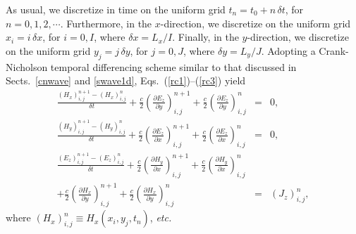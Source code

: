 As usual, we discretize in time on the uniform grid $t_n=t_0+n\,\delta t$, for $n=0,1,2,\cdots$.
Furthermore, in the  $x$-direction, we discretize on the uniform grid $x_i = i\,\delta x$, for
$i=0,I$, where $\delta x = L_x/I$.
 Finally, in the  $y$-direction, we discretize on the uniform grid $y_j = j\,\delta y$, for
$j=0,J$, where $\delta y = L_y/J$. Adopting a Crank-Nicholson  temporal differencing scheme
similar to that discussed in Sects.~\ref{cnwave} and \ref{swave1d}, Eqs.~(\ref{rc1})--(\ref{rc3}) yield
\begin{eqnarray}\label{xrc1}
\frac{(H_x)_{i,j}^{n+1} -(H_x)_{i,j}^{n}}{\delta t} 
+\frac{c}{2}\left(\frac{\partial E_z}{\partial y}\right)^{n+1}_{i,j}
+\frac{c}{2}\left(\frac{\partial E_z}{\partial y}\right)^{n}_{i,j} &=& 0,\\[0.5ex]
\frac{(H_y)_{i,j}^{n+1} -(H_y)_{i,j}^{n}}{\delta t} 
+\frac{c}{2}\left(\frac{\partial E_z}{\partial x}\right)^{n+1}_{i,j}
+\frac{c}{2}\left(\frac{\partial E_z}{\partial x}\right)^{n}_{i,j} &=& 0,\\[0.5ex]
\frac{(E_z)_{i,j}^{n+1} -(E_z)_{i,j}^{n}}{\delta t} 
+\frac{c}{2}\left(\frac{\partial H_y}{\partial x}\right)^{n+1}_{i,j}
+\frac{c}{2}\left(\frac{\partial H_y}{\partial x}\right)^{n}_{i,j}&&\nonumber\\[0.5ex]
+\frac{c}{2}\left(\frac{\partial H_x}{\partial y}\right)^{n+1}_{i,j}
+\frac{c}{2}\left(\frac{\partial H_x}{\partial y}\right)^{n}_{i,j} &=& (J_z)_{i,j}^n,\label{xrc3}
\end{eqnarray}
where $(H_x)_{i,j}^n\equiv H_x(x_i, y_j, t_n)$, {\em etc.}

